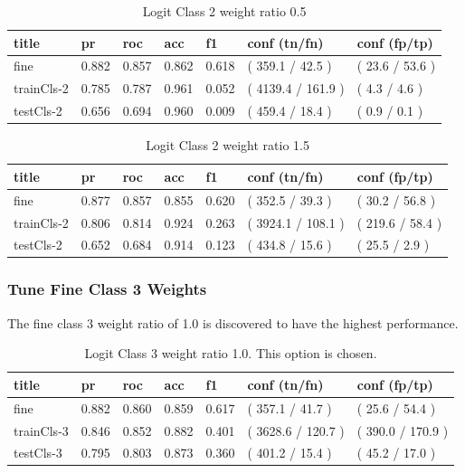 \documentclass[ms]{nuthesis}
\begin{document}
\FloatBarrier
\begin{table}[H]
\centering
\caption{Logit Class 2 weight ratio 0.5}
\label{tab:LogitCls2-Wtp5}
\begin{tabular}{|l||l||l||l||l||l||l|}\toprule
title & pr & roc & acc & f1 & conf (tn/fn) & conf (fp/tp) \\ \midrule
fine & 0.882 & 0.857 & 0.862 & 0.618 & ( 359.1 / 42.5 ) & ( 23.6 / 53.6 ) \\
trainCls-2 & 0.785 & 0.787 & 0.961 & 0.052 & ( 4139.4 / 161.9 ) & ( 4.3 / 4.6 ) \\
testCls-2 & 0.656 & 0.694 & 0.960 & 0.009 & ( 459.4 / 18.4 ) & ( 0.9 / 0.1 ) \\ \bottomrule
\end{tabular}
\end{table}
\FloatBarrier

\FloatBarrier
\begin{table}[H]
\centering
\caption{Logit Class 2 weight ratio 1.5}
\label{tab:LogRegCls2-Wt1p5}
\begin{tabular}{|l||l||l||l||l||l||l|}\toprule
title & pr & roc & acc & f1 & conf (tn/fn) & conf (fp/tp) \\ \midrule
fine & 0.877 & 0.857 & 0.855 & 0.620 & ( 352.5 / 39.3 ) & ( 30.2 / 56.8 ) \\
trainCls-2 & 0.806 & 0.814 & 0.924 & 0.263 & ( 3924.1 / 108.1 ) & ( 219.6 / 58.4 ) \\
testCls-2 & 0.652 & 0.684 & 0.914 & 0.123 & ( 434.8 / 15.6 ) & ( 25.5 / 2.9 ) \\ \bottomrule
\end{tabular}
\end{table}
\FloatBarrier


\subsubsection{Tune Fine Class 3 Weights}
\par The fine class 3 weight ratio of 1.0 is discovered to have the highest performance.
\FloatBarrier
\begin{table}[H]
\centering
\caption{Logit Class 3 weight ratio 1.0. This option is chosen.}
\label{tab:LogRegCls3-Wt1}
\begin{tabular}{|l||l||l||l||l||l||l|}\toprule
title & pr & roc & acc & f1 & conf (tn/fn) & conf (fp/tp) \\ \midrule
fine & 0.882 & 0.860 & 0.859 & 0.617 & ( 357.1 / 41.7 ) & ( 25.6 / 54.4 ) \\
trainCls-3 & 0.846 & 0.852 & 0.882 & 0.401 & ( 3628.6 / 120.7 ) & ( 390.0 / 170.9 ) \\
testCls-3 & 0.795 & 0.803 & 0.873 & 0.360 & ( 401.2 / 15.4 ) & ( 45.2 / 17.0 ) \\ \bottomrule
\end{tabular}
\end{table}
\FloatBarrier
\end{document}
